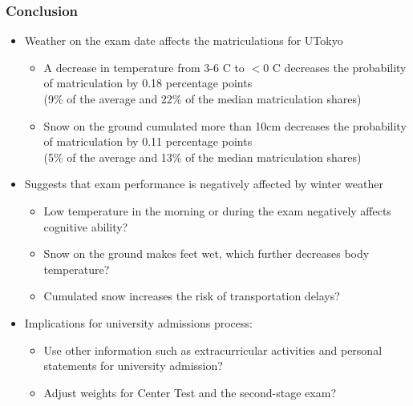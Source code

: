 \documentclass[10pt, pdfmx,hiresbb]{beamer}
\begin{document}
\begin{frame}
  \frametitle{Conclusion}
  \begin{itemize}
    \item Weather on the exam date affects the matriculations for UTokyo
      \begin{itemize}
        \item A decrease in temperature from 3-6 \degree C to $<$0 \degree C decreases the probability of matriculation by 0.18 percentage points \\
          (9\% of the average and 22\% of the median matriculation shares)
        \item Snow on the ground cumulated more than 10cm decreases the probability of matriculation by 0.11 percentage points \\
          (5\% of the average and 13\% of the median matriculation shares)
      \end{itemize}
    \item Suggests that exam performance is negatively affected by winter weather
      \begin{itemize}
        \item Low temperature in the morning or during the exam negatively affects cognitive ability?
        \item Snow on the ground makes feet wet, which further decreases body temperature?
        \item Cumulated snow increases the risk of transportation delays?
      \end{itemize}
    \item Implications for university admissions process:
      \begin{itemize}
        \item Use other information such as extracurricular activities and personal statements for university admission?
        \item Adjust weights for Center Test and the second-stage exam?
      \end{itemize}
  \end{itemize}
\end{frame}

\appendix
\end{document}
